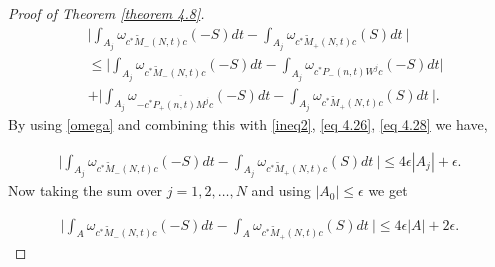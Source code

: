 \documentclass[10pt,a4paper]{amsart}
\begin{document}
\begin{proof}[Proof of Theorem \ref{theorem 4.8}]
  \begin{align*} 
  &\Big | \int_{A_j} \omega_{c^* \tilde M_-(N,t)c} (-S) dt   -\int_{A_j} \omega_{c^* \tilde M_+(N,t)c}(S) dt\ \Big | \\ 
  & \leq 
  \Big | \int_{A_j} \omega_{c^* \tilde M_-(N,t)c} (-S) dt  - \int_{A_j} \omega_{c^* P_-(n,t) W^j c}(-S) dt \Big |\\ & + \Big | \int_{A_j} \omega_{-c^*  \overline {P_+(n,t)M^j }c }(-S) dt - \int_{A_j} \omega_{c^* \tilde M_+(N,t)c}(S) dt\ \Big |
  .\end{align*}  
 By using \eqref{omega} and   combining this with \eqref{ineq2}, \eqref{eq 4.26}, \eqref{eq 4.28} we have,
 
 \begin{align*} \Big | \int_{A_j} \omega_{c^* \tilde M_-(N,t)c} (-S) dt   -\int_{A_j} \omega_{c^* \tilde M_+(N,t)c}(S) dt\ \Big |  
   \leq 4\epsilon |A_j| + \epsilon
 . \end{align*}  
 Now taking the sum over $j=1,2, \dots,N$ and using $|A_0 |\leq \epsilon $ we get 
  
  \begin{align*}
  \Big | \int_{A} \omega_{c^* \tilde M_-(N,t)c} (-S) dt   -\int_{A} \omega_{c^* \tilde M_+(N,t)c}(S) dt\ \Big |  
   \leq 4\epsilon |A| + 2\epsilon.
  \end{align*}  \end{proof}
\end{document}
